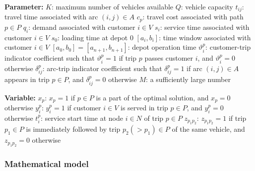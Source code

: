 \documentclass[11pt]{article}
\begin{document}
\noindent
\textbf{Parameter:}
\newline
$K$: maximum number of vehicles available
\newline
$Q$: vehicle capacity
\newline
$t_{ij}$: travel time associated with arc $(i, j) \in A$
\newline
$c_p$: travel cost associated with path $p \in P$
\newline
$q_i$: demand associated with customer $i \in V$
\newline
$s_i$: service time associated with customer $i \in V$
\newline
$s_0$: loading time at depot $0$
\newline
$[a_i, b_i]$: time window associated with customer $i \in V$
\newline
$[a_0, b_0] = [a_{n + 1}, b_{n + 1}]$: depot operation time
\newline
$\vartheta^p_i$: customer-trip indicator coefficient such that $\vartheta^p_i = 1$ if trip $p$ passes customer $i$, and $\vartheta^p_i = 0$ otherwise
\newline
$\delta^p_{ij}$: arc-trip indicator coefficient such that $\delta^p_{ij} = 1$ if arc $(i, j) \in A$ appears in trip $p \in P$, and $\delta^p_{ij} = 0$ otherwise
\newline
$M$: a sufficiently large number
\newline

\noindent
\textbf{Variable:}
\newline
$x_p$: $x_p = 1$ if $p \in P$ is a part of the optimal solution, and $x_p = 0$ otherwise
\newline
$y^p_i$: $y^p_i = 1$ if customer $i \in V$ is served in trip $p \in P$, and $y^p_i = 0$ otherwise
\newline
$t^p_i$: service start time at node $i \in N$ of trip $p \in P$
\newline
$z_{{p_1}{p_2}}$: $z_{{p_1}{p_2}} = 1$ if trip $p_1 \in P$ is immediately followed by trip $p_2 (> p_1) \in P$ of the same vehicle, and $z_{{p_1}{p_2}} = 0$ otherwise

\subsubsection{Mathematical model}
\end{document}
